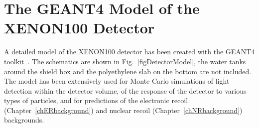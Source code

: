\section{The GEANT4 Model of the XENON100 Detector}
\label{secGeant4model}

A detailed model of the XENON100 detector has been created with the GEANT4 toolkit~\cite{g4}.
The schematics are shown in Fig.~\ref{figDetectorModel}, the water tanks around the shield box and the polyethylene slab on the bottom are not included. The model has been extensively used for  Monte Carlo simulations of light detection within the detector volume, of the response of the detector to various types of particles, and for predictions of the electronic recoil (Chapter~\ref{chERbackground}) and nuclear recoil (Chapter~\ref{chNRbackground}) backgrounds.

